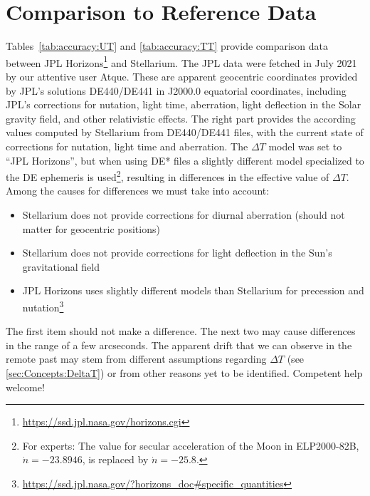\section{Comparison to Reference Data}
\label{sec:Accuracy:JPLcomparison}

Tables~\ref{tab:accuracy:UT} and \ref{tab:accuracy:TT} 
provide comparison data between JPL
Horizons\footnote{\url{https://ssd.jpl.nasa.gov/horizons.cgi}} and
Stellarium. The JPL data were fetched in July 2021 by our
attentive user Atque. These are apparent geocentric coordinates
provided by JPL's solutions DE440/DE441 in J2000.0 equatorial
coordinates, including JPL's corrections for nutation, light time,
aberration, light deflection in the Solar gravity field, and other
relativistic effects. The right part provides the according values
computed by Stellarium from DE440/DE441 files, with the current state of corrections for
nutation, light time and aberration. The $\Delta T$ model was set to
``JPL Horizons'', but when using DE* files a slightly different model
specialized to the DE ephemeris is used\footnote{For experts: The value
  for secular acceleration of the Moon in ELP2000-82B, $\dot{n}=-23.8946$,
  is replaced by $\dot{n}=-25.8$.}, resulting in differences in the effective 
  value of $\Delta T$.  Among the causes for differences we must take into account:
\begin{itemize}
\item Stellarium does not provide corrections for diurnal aberration (should not matter for geocentric positions)
\item Stellarium does not provide corrections for light deflection in the Sun's gravitational field
\item JPL Horizons uses slightly different models than Stellarium for precession and nutation\footnote{\url{https://ssd.jpl.nasa.gov/?horizons_doc#specific_quantities}}
\end{itemize}
The first item should not make a difference. The next two may cause
differences in the range of a few arcseconds. The apparent drift that
we can observe in the remote past may stem from different assumptions
regarding $\Delta T$ (see \ref{sec:Concepts:DeltaT}) or from other
reasons yet to be identified. Competent help welcome!

\noindent
\colorbox{light-gray}{}



\scriptsize


\normalsize





